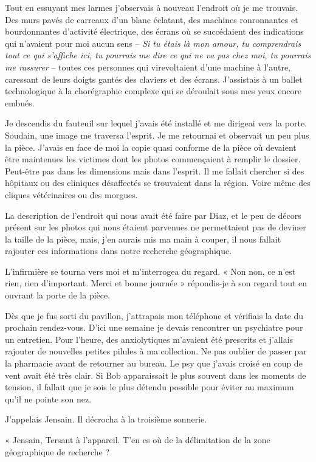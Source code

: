 Tout en essuyant mes larmes j'observais à nouveau l'endroit où je me trouvais. Des murs pavés de carreaux d'un blanc
éclatant, des machines ronronnantes et bourdonnantes d'activité électrique, des écrans où se succédaient des indications
qui n'avaient pour moi aucun sens -- \emph{Si tu étais là mon amour, tu comprendrais tout ce qui s'affiche ici, tu
pourrais me dire ce qui ne va pas chez moi, tu pourrais me rassurer} -- toutes ces personnes qui virevoltaient d'une
machine à l'autre, caressant de leurs doigts gantés des claviers et des écrans. J'assistais à un ballet technologique à 
la chorégraphie complexe qui se déroulait sous mes yeux encore embués.

Je descendis du fauteuil sur lequel j'avais été installé et me dirigeai vers la porte. Soudain, une image me traversa
l'esprit. Je me retournai et observait un peu plus la pièce. J'avais en face de moi la copie quasi conforme de la pièce
où devaient être maintenues les victimes dont les photos commençaient à remplir le dossier. Peut-être pas dans les
dimensions mais dans l'esprit. Il me fallait chercher si des hôpitaux ou des cliniques désaffectés se trouvaient dans la
région. Voire même des cliques vétérinaires ou des morgues.

La description de l'endroit qui nous avait été faire par Diaz, et le peu de décors présent sur les photos qui nous
étaient parvenues ne permettaient pas de deviner la taille de la pièce, mais, j'en aurais mis ma main à couper, il nous
fallait rajouter ces informations dans notre recherche géographique.

L'infirmière se tourna vers moi et m'interrogea du regard. « Non non, ce n'est rien, rien d'important. Merci et bonne 
journée » répondis-je à son regard tout en ouvrant la porte de la pièce.

Dès que je fus sorti du pavillon, j'attrapais mon téléphone et vérifiais la date du prochain rendez-vous. D'ici une 
semaine je devais rencontrer un psychiatre pour un entretien. Pour l'heure, des anxiolytiques m'avaient été prescrits et 
j'allais rajouter de nouvelles petites pilules à ma collection. Ne pas oublier de passer par la pharmacie avant de 
retourner au bureau. Le psy que j'avais croisé en coup de vent avait été très clair. Si Bob apparaissait le plus souvent 
dans les moments de tension, il fallait que je sois le plus détendu possible pour éviter au maximum qu'il ne pointe son 
nez.

J'appelais Jensain. Il décrocha à la troisième sonnerie.

« Jensain, Tersant à l'appareil. T'en es où de la délimitation de la zone géographique de recherche ?

